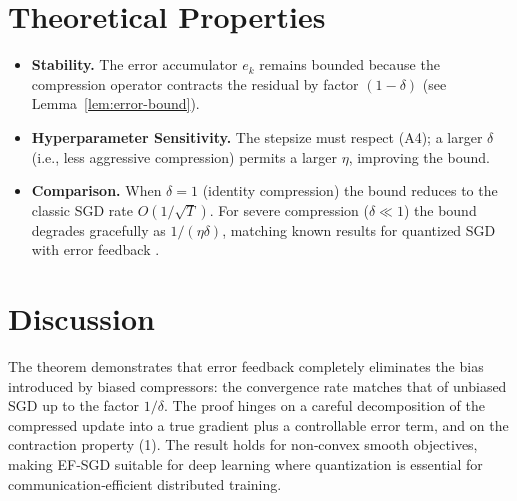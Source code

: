 \documentclass{article}
\begin{document}
\section*{Theoretical Properties}
\begin{itemize}
\item \textbf{Stability.} The error accumulator $e_k$ remains bounded because the compression operator contracts the residual by factor $(1-\delta)$ (see Lemma~\ref{lem:error-bound}).
\item \textbf{Hyperparameter Sensitivity.} The stepsize must respect (A4); a larger $\delta$ (i.e., less aggressive compression) permits a larger $\eta$, improving the bound.
\item \textbf{Comparison.} When $\delta=1$ (identity compression) the bound reduces to the classic SGD rate $O(1/\sqrt{T})$. For severe compression ($\delta\ll1$) the bound degrades gracefully as $1/(\eta\delta)$, matching known results for quantized SGD with error feedback \cite{Seide2014,Karimireddy2020}.
\end{itemize}

\section*{Discussion}
The theorem demonstrates that error feedback completely eliminates the bias introduced by biased compressors: the convergence rate matches that of unbiased SGD up to the factor $1/\delta$. The proof hinges on a careful decomposition of the compressed update into a true gradient plus a controllable error term, and on the contraction property (1). The result holds for non‑convex smooth objectives, making EF‑SGD suitable for deep learning where quantization is essential for communication‑efficient distributed training.

\newpage
\end{document}
